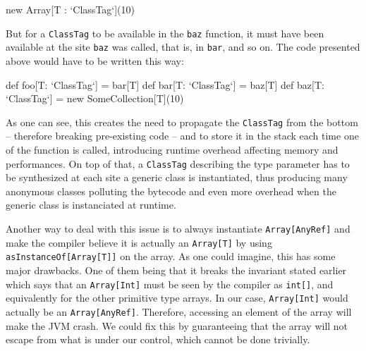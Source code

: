 \begin{lstlisting-nobreak}
  new Array[T : `ClassTag`](10)
\end{lstlisting-nobreak}

But for a \lstinline|ClassTag| to be available in the \lstinline|baz| function, it must have been available at the site \lstinline|baz| was called, that is, in \lstinline|bar|, and so on. The code presented above would have to be written this way:

\begin{lstlisting-nobreak}
  def foo[T: `ClassTag`] = bar[T]
  def bar[T: `ClassTag`] = baz[T]
  def baz[T: `ClassTag`] = new SomeCollection[T](10)
\end{lstlisting-nobreak}

As one can see, this creates the need to propagate the \lstinline|ClassTag| from the bottom -- therefore breaking pre-existing code -- and to store it in the stack each time one of the function is called, introducing runtime overhead affecting memory and performances. On top of that, a \lstinline|ClassTag| describing the type parameter has to be synthesized at each site a generic class is instantiated, thus producing many anonymous classes polluting the bytecode and even more overhead when the generic class is instanciated at runtime.


Another way to deal with this issue is to always instantiate \lstinline|Array[AnyRef]| and make the compiler believe it is actually an \lstinline|Array[T]| by using \lstinline|asInstanceOf[Array[T]]| on the array. As one could imagine, this has some major drawbacks. One of them being that it breaks the invariant stated earlier which says that an \lstinline|Array[Int]| must be seen by the compiler as \lstinline|int[]|, and equivalently for the other primitive type arrays. In our case, \lstinline|Array[Int]| would actually be an \lstinline|Array[AnyRef]|. Therefore, accessing an element of the array will make the JVM crash. We could fix this by guaranteeing that the array will not escape from what is under our control, which cannot be done trivially.


